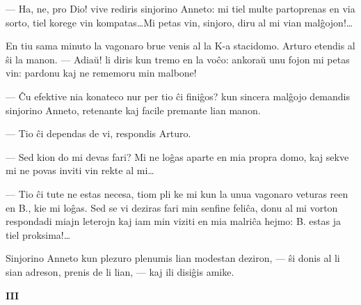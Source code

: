  --- Ha, ne, pro Dio! vive rediris sinjorino Anneto: mi tiel multe
partoprenas en via sorto, tiel korege vin kompatas\dots Mi petas
vin, sinjoro, diru al mi vian mal\^gojon!\dots

   En tiu sama minuto la vagonaro brue venis al la K-a stacidomo. Arturo
etendis al \^si la manon. --- Adia\u u! li diris kun tremo en la
vo\^co: ankora\u u unu fojon mi petas vin: pardonu kaj ne rememoru
min malbone!

 --- \^Cu efektive nia konateco nur per tio \^ci fini\^gos? kun sincera
mal\^gojo demandis sinjorino Anneto, retenante kaj facile premante
lian manon.

 --- Tio \^ci dependas de vi, respondis Arturo.

 --- Sed kion do mi devas fari? Mi ne lo\^gas aparte en mia propra domo,
kaj sekve mi ne povas inviti vin rekte al mi\dots


 --- Tio \^ci tute ne estas necesa, tiom pli ke mi kun la unua vagonaro
veturas reen en B., kie mi lo\^gas. Sed se vi deziras fari min
senfine feli\^ca, donu al mi vorton respondadi miajn leterojn kaj
iam min viziti en mia malri\^ca hejmo: B. estas ja tiel
proksima!\dots

   Sinjorino Anneto kun plezuro plenumis lian modestan deziron, --- \^si
donis al li sian adreson, prenis de li lian, --- kaj ili disi\^gis
amike.

\begin{center}
\textbf{III}
\end{center}

